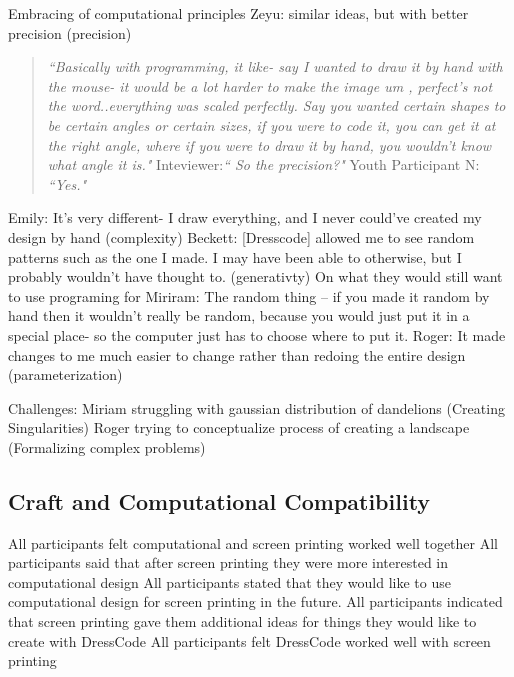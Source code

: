 \documentclass{sigchi}
\begin{document}
Embracing of computational principles
Zeyu: similar ideas, but with better precision (precision)
\begin{quotation}
 \textit{``Basically with programming, it like- say I wanted to draw it by hand with the mouse- it would be a lot harder to make the image um , perfect's not the word..everything was scaled perfectly. Say you wanted certain shapes to be certain angles or certain sizes, if you were to code it, you can get it at the right angle, where if you were to draw it by hand, you wouldn't know what angle it is."}
 Inteviewer:\textit{`` So the precision?"}
Youth Participant N: \textit{``Yes."}
\end{quotation}
Emily: It's very different- I draw everything, and I never could've created my design by hand (complexity)
Beckett: [Dresscode] allowed me to see random patterns such as the one I made. I may have been able to otherwise, but I probably wouldn't have thought to. (generativty)
On what they would still want to use programing for
Miriram: The random thing – if you made it random by hand then it wouldn't really be random, because you would just put it in a special place- so the computer just has to choose where to put it.
Roger: It made changes to me much easier to change rather than redoing the entire design (parameterization)

Challenges:
Miriam struggling with gaussian distribution of dandelions (Creating Singularities)
Roger trying to conceptualize process of creating a landscape (Formalizing complex problems)


\subsection{Craft and Computational Compatibility}
All participants felt computational and screen printing worked well together
All participants said that after screen printing they were more interested in computational design
All participants stated that they would like to use computational design for screen printing in the future.
All participants indicated that screen printing gave them additional ideas for things they would like to create with DressCode
All participants felt DressCode worked well with screen printing
\end{document}
